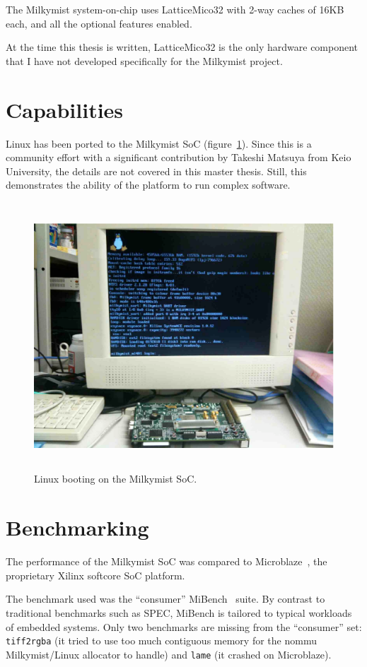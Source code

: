 \documentclass[a4paper,11pt]{kthesis}
\begin{document}
The Milkymist system-on-chip uses LatticeMico32 with 2-way caches of 16KB each, and all the optional features enabled.

At the time this thesis is written, LatticeMico32 is the only hardware component that I have not developed specifically for the Milkymist project.

\section{Capabilities}
Linux has been ported to the Milkymist SoC (figure~\ref{fig:linux}). Since this is a community effort with a significant contribution by Takeshi Matsuya from Keio University, the details are not covered in this master thesis. Still, this demonstrates the ability of the platform to run complex software.

\begin{figure}[htp]
\centering
\includegraphics[height=100mm]{linux.eps}
\caption{Linux booting on the Milkymist SoC.}
\label{fig:linux}
\end{figure}

\section{Benchmarking}
The performance of the Milkymist SoC was compared to Microblaze~\cite{microblaze}, the proprietary Xilinx softcore SoC platform.

The benchmark used was the ``consumer'' MiBench~\cite{mibench} suite. By contrast to traditional benchmarks such as SPEC, MiBench is tailored to typical workloads of embedded systems. Only two benchmarks are missing from the ``consumer'' set: \verb!tiff2rgba! (it tried to use too much contiguous memory for the nommu Milkymist/Linux allocator to handle) and \verb!lame! (it crashed on Microblaze).
\end{document}
